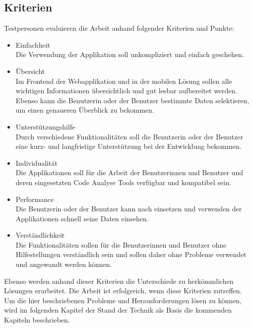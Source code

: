 \subsection{Kriterien} 
Testpersonen evaluieren die Arbeit anhand folgender Kriterien und Punkte:
\begin{itemize}
\item Einfachheit \\ Die Verwendung der Applikation soll unkompliziert und einfach geschehen. 
\item Übersicht \\ Im Frontend der Webapplikation und in der mobilen Lösung sollen alle wichtigen Informationen übersichtlich und gut lesbar aufbereitet werden. Ebenso kann die Benutzerin oder der Benutzer bestimmte Daten selektieren, um einen genaueren Überblick zu bekommen.
\item Unterstützungshilfe \\ Durch verschiedene Funktionalitäten soll die Benutzerin oder der Benutzer eine kurz- und langfristige Unterstützung bei der Entwicklung bekommen.
\item Individualität \\ Die Applikationen soll für die Arbeit der Benutzerinnen und Benutzer und deren eingesetzten Code Analyse Tools verfügbar und kompatibel sein. 
\item Performance \\ Die Benutzerin oder der Benutzer kann nach einsetzen und verwenden der Applikationen schnell seine Daten einsehen.
\item Verständlichkeit \\ Die Funktionalitäten sollen für die Benutzerinnen und Benutzer ohne Hilfestellungen verständlich sein und sollen daher ohne Probleme verwendet und angewandt werden können.
\end{itemize}

Ebenso werden anhand dieser Kriterien die Unterschiede zu herkömmlichen Lösungen erarbeitet. Die Arbeit ist erfolgreich, wenn diese Kriterien zutreffen. \\ 

Um die hier beschriebenen Probleme und Herausforderungen lösen zu können, wird im folgenden Kapitel der Stand der Technik als Basis die kommenden Kapiteln beschrieben.
